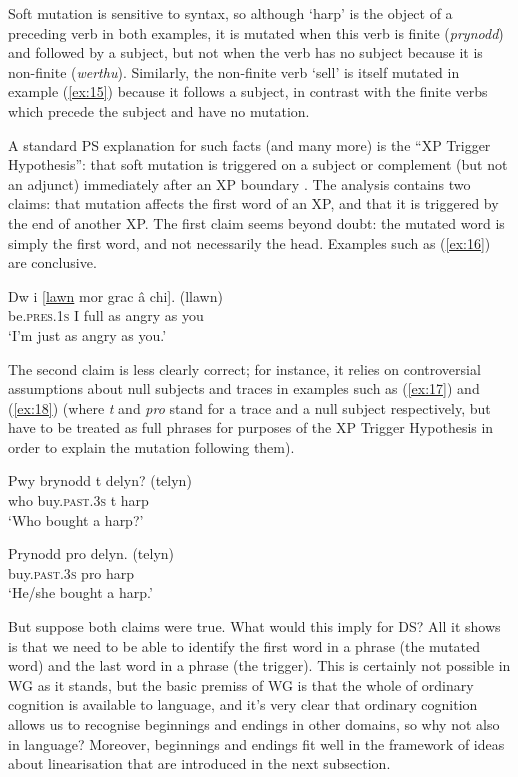 \documentclass[output=paper]{langscibook}
\begin{document}
Soft mutation is sensitive to syntax, so although ‘harp’ is the object of a preceding verb in both examples, it is mutated when this verb is finite (\emph{prynodd}) and followed by a subject, but not when the verb has no subject because it is non-finite (\emph{werthu}). Similarly, the non-finite verb ‘sell’ is itself mutated in example (\ref{ex:15}) because it follows a subject, in contrast with the finite verbs which precede the subject and have no mutation.

A standard PS explanation for such facts (and many more) is the ``XP Trigger Hypothesis'': that soft mutation is triggered on a subject or complement (but not an adjunct) immediately after an XP boundary \citep[226]{BorsleyTallermanWillis2007}. The analysis contains two claims: that mutation affects the first word of an XP, and that it is triggered by the end of another XP. The first claim seems beyond doubt: the mutated word is simply the first word, and not necessarily the head. Examples such as (\ref{ex:16}) are conclusive.

\begin{exe}
	\ex \label{ex:16}
	\gll Dw i [\underline{lawn} mor grac â chi]. (llawn)\\
	be.\textsc{pres}.1\textsc{s} I full as angry as you\\
	\glt ‘I’m just as angry as you.’
\end{exe}

The second claim is less clearly correct; for instance, it relies on controversial assumptions about null subjects and traces in examples such as (\ref{ex:17}) and (\ref{ex:18}) (where \emph{t} and \emph{pro} stand for a trace and a null subject respectively, but have to be treated as full phrases for purposes of the XP Trigger Hypothesis in order to explain the mutation following them).

\begin{exe}
	\ex \label{ex:17}
	\gll Pwy brynodd t delyn? (telyn)\\
	who buy.\textsc{past}.3\textsc{s} t harp\\
	\glt ‘Who bought a harp?’

	\ex \label{ex:18}
	\gll Prynodd pro delyn. (telyn)\\
	buy.\textsc{past}.3\textsc{s} pro harp\\
	\glt ‘He/she bought a harp.’
\end{exe}

But suppose both claims were true. What would this imply for DS? All it shows is that we need to be able to identify the first word in a phrase (the mutated word) and the last word in a phrase (the trigger). This is certainly not possible in WG as it stands, but the basic premiss of WG is that the whole of ordinary cognition is available to language, and it’s very clear that ordinary cognition allows us to recognise beginnings and endings in other domains, so why not also in language? Moreover, beginnings and endings fit well in the framework of ideas about linearisation that are introduced in the next subsection.
\end{document}
